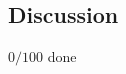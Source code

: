 \documentclass[a4paper]{article}
\begin{document}
\begin{multicols}{2}







\section{Discussion}

$0/100$ done


%

\printbibliography

\end{multicols}
\end{document}
